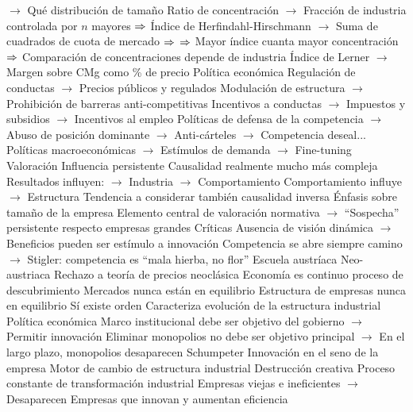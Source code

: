 \documentclass{nuevotema}
\begin{document}
\begin{esquemal}
				\4[] $\to$ Qué distribución de tamaño
				\4[] Ratio de concentración
				\4[] $\to$ Fracción de industria controlada por $n$ mayores
				\4[] $\Rightarrow$ 
				\4[] Índice de Herfindahl-Hirschmann
				\4[] $\to$ Suma de cuadrados de cuota de mercado
				\4[] $\Rightarrow$ 
				\4[] $\Rightarrow$ Mayor índice cuanta mayor concentración
				\4[] $\Rightarrow$ Comparación de concentraciones depende de industria
				\4[] Índice de Lerner
				\4[] $\to$ Margen sobre CMg como \% de precio
				\4 Política económica
				\4[] Regulación de conductas
				\4[] $\to$ Precios públicos y regulados
				\4[] Modulación de estructura
				\4[] $\to$ Prohibición de barreras anti-competitivas
				\4[] Incentivos a conductas
				\4[] $\to$ Impuestos y subsidios
				\4[] $\to$ Incentivos al empleo
				\4[] Políticas de defensa de la competencia
				\4[] $\to$ Abuso de posición dominante
				\4[] $\to$ Anti-cárteles
				\4[] $\to$ Competencia deseal...
				\4[] Políticas macroeconómicas
				\4[] $\to$ Estímulos de demanda
				\4[] $\to$ Fine-tuning
			\3 Valoración
				\4 Influencia persistente
				\4 Causalidad realmente mucho más compleja
				\4[] Resultados influyen:
				\4[] $\to$ Industria
				\4[] $\to$ Comportamiento
				\4[] Comportamiento influye
				\4[] $\to$ Estructura
				\4[] Tendencia a considerar también causalidad inversa
				\4 Énfasis sobre tamaño de la empresa
				\4[] Elemento central de valoración normativa
				\4[] $\to$ ``Sospecha'' persistente respecto empresas grandes
				\4 Críticas
				\4[] Ausencia de visión dinámica
				\4[] $\to$ Beneficios pueden ser estímulo a innovación
				\4[] Competencia se abre siempre camino
				\4[] $\to$ Stigler: competencia es ``mala hierba, no flor''
		\2 Escuela austríaca
			\3 Neo-austriaca
				\4 Rechazo a teoría de precios neoclásica
				\4 Economía es continuo proceso de descubrimiento
				\4 Mercados nunca están en equilibrio
				\4[] Estructura de empresas nunca en equilibrio
				\4 Sí existe orden
				\4[] Caracteriza evolución de la estructura industrial
				\4 Política económica
				\4[] Marco institucional debe ser objetivo del gobierno
				\4[] $\to$ Permitir innovación
				\4[] Eliminar monopolios no debe ser objetivo principal
				\4[] $\to$ En el largo plazo, monopolios desaparecen
			\3 Schumpeter
				\4 Innovación en el seno de la empresa
				\4[] Motor de cambio de estructura industrial
				\4 Destrucción creativa
				\4[] Proceso constante de transformación industrial
				\4[] Empresas viejas e ineficientes
				\4[] $\to$ Desaparecen
				\4[] Empresas que innovan y aumentan eficiencia

\end{esquemal}
\end{document}
